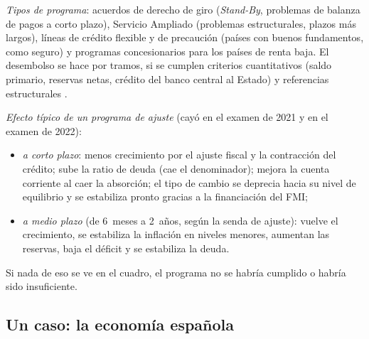 \documentclass[11pt]{article}
\begin{document}
\begin{anotaciones}
\emph{Tipos de programa}: acuerdos de derecho de giro (\emph{Stand-By}, problemas de balanza de pagos a corto plazo), Servicio Ampliado (problemas estructurales, plazos más largos), líneas de crédito flexible y de precaución (países con buenos fundamentos, como seguro) y programas concesionarios para los países de renta baja. El desembolso se hace por tramos, si se cumplen criterios cuantitativos (saldo primario, reservas netas, crédito del banco central al Estado) y referencias estructurales \parencite{FMI2025Condicionalidad} .

\emph{Efecto típico de un programa de ajuste} (cayó en el examen de 2021 y en el examen de 2022):
\begin{itemize}
\item \emph{a corto plazo}: menos crecimiento por el ajuste fiscal y la contracción del crédito; sube la ratio de deuda (cae el denominador); mejora la cuenta corriente al caer la absorción; el tipo de cambio se deprecia hacia su nivel de equilibrio y se estabiliza pronto gracias a la financiación del FMI;
\item \emph{a medio plazo} (de 6~meses a 2~años, según la senda de ajuste): vuelve el crecimiento, se estabiliza la inflación en niveles menores, aumentan las reservas, baja el déficit y se estabiliza la deuda.
\end{itemize}
Si nada de eso se ve en el cuadro, el programa no se habría cumplido o habría sido insuficiente.
\end{anotaciones}

\subsection{Un caso: la economía española}\label{anexo:espana}
\end{document}
